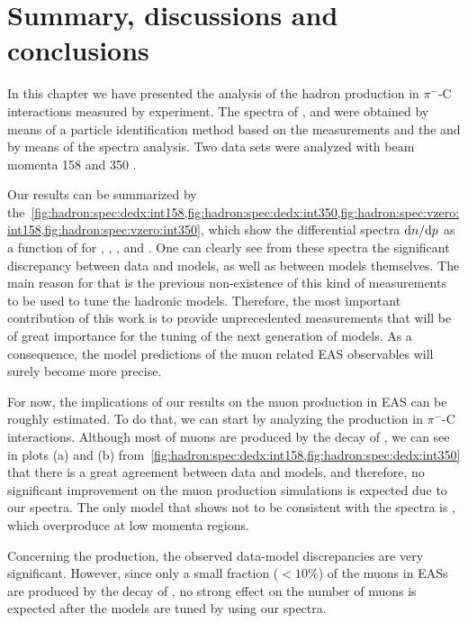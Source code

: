 \section{Summary, discussions and conclusions}
\label{sec:hadron:conclusions}

In this chapter we have presented the
analysis of the hadron production in $\pi^-$-C interactions
measured by \NASixtyOne experiment. 
The spectra of \pions, \kaons and \protonpm were obtained by
means of a particle identification method based on the
\dedx measurements and the \lambs and \kzeros by means
of the \minv spectra analysis. Two data sets
were analyzed with beam momenta 158 and 350 \GeVc.

Our results can be summarized by
the~\cref{fig:hadron:spec:dedx:int158,fig:hadron:spec:dedx:int350,fig:hadron:spec:vzero:int158,fig:hadron:spec:vzero:int350}, which show the differential spectra $\text{d}n/\text{d}p$
as a function of \pp for \pions, \kaons, \protonpm, \lambs and \kzeros.
One can clearly see from these spectra
the significant discrepancy between data and models,
as well as between models themselves. 
The main reason for that is the previous non-existence
of this kind of measurements to be used to tune
the hadronic models. Therefore, the most important
contribution of this work is to provide unprecedented
measurements that will be of great importance
for the tuning of the next generation of models.
As a consequence, the model predictions of the muon related
EAS observables will surely become more precise.

For now, the implications of our results on the muon
production in EAS can be roughly estimated.
To do that, we can start by analyzing the \pions production
in $\pi^{-}$-C interactions. Although most of muons are
produced by the decay of \pions, we can see in plots
(a) and (b) from~\cref{fig:hadron:spec:dedx:int158,fig:hadron:spec:dedx:int350}
that there is a great agreement between data and models,
and therefore, no significant improvement on the muon
production simulations is expected due to our \pions spectra.  
The only model that shows not to be consistent
with the \pions spectra is \DPMJetLong, which overproduce
\pions at low momenta regions.

Concerning the \kaons production, the observed data-model
discrepancies are very significant. However,
since only a small fraction ($<10\%$) of the muons in
EASs are produced by the decay of \kaons,
no strong effect on the number of muons is expected
after the models are tuned by using our \kaons spectra.

